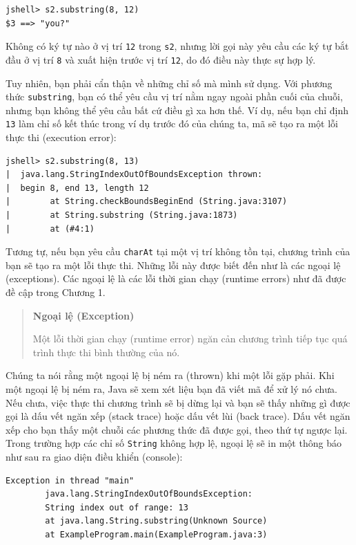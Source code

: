 \begin{verbatim}
jshell> s2.substring(8, 12)
$3 ==> "you?"
\end{verbatim}

Không có ký tự nào ở vị trí \texttt{12} trong \texttt{s2}, nhưng lời gọi
này yêu cầu các ký tự bắt đầu ở vị trí \texttt{8} và xuất hiện trước vị
trí \texttt{12}, do đó điều này thực sự hợp lý.

Tuy nhiên, bạn phải cẩn thận về những chỉ số mà mình sử dụng. Với phương
thức \texttt{substring}, bạn có thể yêu cầu vị trí nằm ngay ngoài phần
cuối của chuỗi, nhưng bạn không thể yêu cầu bất cứ điều gì xa hơn thế.
Ví dụ, nếu bạn chỉ định \texttt{13} làm chỉ số kết thúc trong ví dụ
trước đó của chúng ta, mã sẽ tạo ra một lỗi thực thi (execution error):

\begin{verbatim}
jshell> s2.substring(8, 13)
|  java.lang.StringIndexOutOfBoundsException thrown:
|  begin 8, end 13, length 12
|        at String.checkBoundsBeginEnd (String.java:3107)
|        at String.substring (String.java:1873)
|        at (#4:1)
\end{verbatim}

Tương tự, nếu bạn yêu cầu \texttt{charAt} tại một vị trí không tồn tại,
chương trình của bạn sẽ tạo ra một lỗi thực thi. Những lỗi này được biết
đến như là các ngoại lệ (exceptions). Các ngoại lệ là các lỗi thời gian
chạy (runtime errors) như đã được đề cập trong Chương 1.

\begin{quote}
\textbf{Ngoại lệ (Exception)}

Một lỗi thời gian chạy (runtime error) ngăn cản chương trình tiếp tục
quá trình thực thi bình thường của nó.
\end{quote}

Chúng ta nói rằng một ngoại lệ bị ném ra (thrown) khi một lỗi gặp phải.
Khi một ngoại lệ bị ném ra, Java sẽ xem xét liệu bạn đã viết mã để xử lý
nó chưa. Nếu chưa, việc thực thi chương trình sẽ bị dừng lại và bạn sẽ
thấy những gì được gọi là dấu vết ngăn xếp (stack trace) hoặc dấu vết
lùi (back trace). Dấu vết ngăn xếp cho bạn thấy một chuỗi các phương
thức đã được gọi, theo thứ tự ngược lại. Trong trường hợp các chỉ số
\texttt{String} không hợp lệ, ngoại lệ sẽ in một thông báo như sau ra
giao diện điều khiển (console):

\begin{verbatim}
Exception in thread "main" 
        java.lang.StringIndexOutOfBoundsException: 
        String index out of range: 13 
        at java.lang.String.substring(Unknown Source) 
        at ExampleProgram.main(ExampleProgram.java:3)
\end{verbatim}

